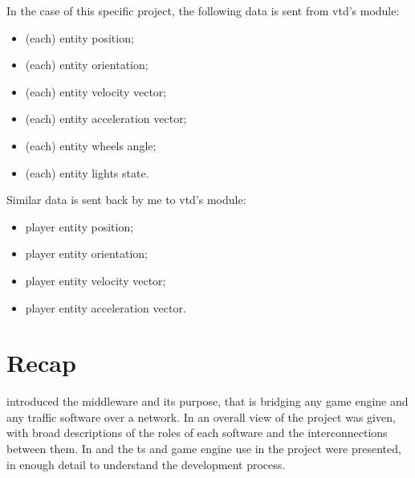 

In the case of this specific project, the following data is sent from \gls{vtd}'s  module:

\begin{itemize}
	\item (each) entity position;
	\item (each) entity orientation;
	\item (each) entity velocity vector;
	\item (each) entity acceleration vector;
	\item (each) entity wheels angle;
	\item (each) entity lights state.
\end{itemize}

\FLOATnoindent Similar data is sent back by \gls{me} to \gls{vtd}'s  module:

\begin{itemize}
	\item player entity position;
	\item player entity orientation;
	\item player entity velocity vector;
	\item player entity acceleration vector.
\end{itemize}

\section{Recap}\label{sc:software:recap}

 introduced the \gls{middleware} and its purpose, that is bridging any game engine and any traffic software over a network. In  an overall view of the project was given, with broad descriptions of the roles of each software and the interconnections between them. In  and  the \gls{ts} and game engine use in the project were presented, in enough detail to understand the development process.
